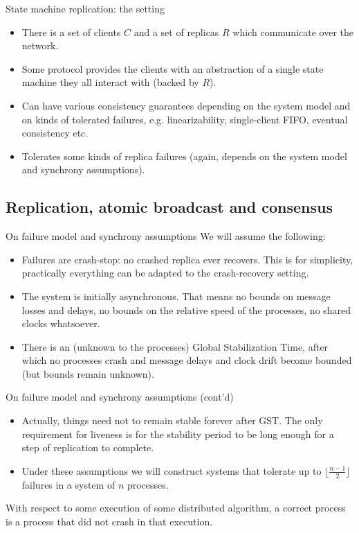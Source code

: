\documentclass{beamer}
\begin{document}
\begin{frame}{State machine replication: the setting}
  \begin{itemize}
    \item There is a set of clients $C$ and a set of replicas $R$ which communicate over the network.
    \item Some protocol provides the clients with an abstraction of a single state machine they all interact with (backed by $R$).
    \item Can have various consistency guarantees depending on the system model and on kinds of tolerated failures, e.g. linearizability, single-client FIFO, eventual consistency etc.
    \item Tolerates some kinds of replica failures (again, depends on the system model and synchrony assumptions).
  \end{itemize}
\end{frame}

\subsection{Replication, atomic broadcast and consensus}

\begin{frame}{On failure model and synchrony assumptions}
  We will assume the following:
  \begin{itemize}
    \item Failures are crash-stop: no crashed replica ever recovers. This is for simplicity, practically everything can be adapted to the crash-recovery setting.
    \item The system is initially asynchronous. That means no bounds on message losses and delays, no bounds on the relative speed of the processes, no shared clocks whatsoever.
    \item There is an (unknown to the processes) Global Stabilization Time, after which no processes crash and message delays and clock drift become bounded (but bounds remain unknown).
  \end{itemize}
\end{frame}

\begin{frame}{On failure model and synchrony assumptions (cont'd)}
  \begin{itemize}
    \item Actually, things need not to remain stable forever after GST. The only requirement for liveness is for the stability period to be long enough for a step of replication to complete.
    \item Under these assumptions we will construct systems that tolerate up to $\lfloor\frac{n-1}{2}\rfloor$ failures in a system of $n$ processes.
  \end{itemize}
  \begin{definition}
    With respect to some execution of some distributed algorithm, a \alert{correct} process is a process that did not crash in that execution.
  \end{definition}
\end{frame}
\end{document}
